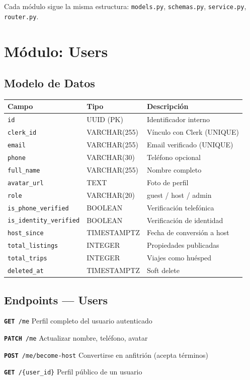 \documentclass[12pt,a4paper]{report}
\newcommand{\apiendpoint}[3]{%
  \noindent\texttt{\textcolor{beelprimary}{\textbf{#1}}\ \textcolor{beeltier}{#2}}%
  \hfill\textcolor{beelgray}{\small #3}\par\smallskip
}
\begin{document}
Cada m\'odulo sigue la misma estructura: \texttt{models.py}, \texttt{schemas.py},
\texttt{service.py}, \texttt{router.py}.

\section{M\'odulo: Users}

\subsection{Modelo de Datos}

\begin{center}
\begin{tabularx}{\textwidth}{L{4.5cm} L{3cm} X}
\toprule
\textbf{Campo} & \textbf{Tipo} & \textbf{Descripci\'on} \\
\midrule
\texttt{id} & UUID (PK) & Identificador interno \\
\texttt{clerk\_id} & VARCHAR(255) & V\'inculo con Clerk (UNIQUE) \\
\texttt{email} & VARCHAR(255) & Email verificado (UNIQUE) \\
\texttt{phone} & VARCHAR(30) & Tel\'efono opcional \\
\texttt{full\_name} & VARCHAR(255) & Nombre completo \\
\texttt{avatar\_url} & TEXT & Foto de perfil \\
\texttt{role} & VARCHAR(20) & guest / host / admin \\
\texttt{is\_phone\_verified} & BOOLEAN & Verificaci\'on telef\'onica \\
\texttt{is\_identity\_verified} & BOOLEAN & Verificaci\'on de identidad \\
\texttt{host\_since} & TIMESTAMPTZ & Fecha de conversi\'on a host \\
\texttt{total\_listings} & INTEGER & Propiedades publicadas \\
\texttt{total\_trips} & INTEGER & Viajes como hu\'esped \\
\texttt{deleted\_at} & TIMESTAMPTZ & Soft delete \\
\bottomrule
\end{tabularx}
\end{center}

\subsection{Endpoints --- Users}

\begin{tcolorbox}[beelinfo, title={/api/v1/users}]
\apiendpoint{GET}{/me}{Perfil completo del usuario autenticado}
\apiendpoint{PATCH}{/me}{Actualizar nombre, tel\'efono, avatar}
\apiendpoint{POST}{/me/become-host}{Convertirse en anfitri\'on (acepta t\'erminos)}
\apiendpoint{GET}{/\{user\_id\}}{Perfil p\'ublico de un usuario}
\end{tcolorbox}
\end{document}
